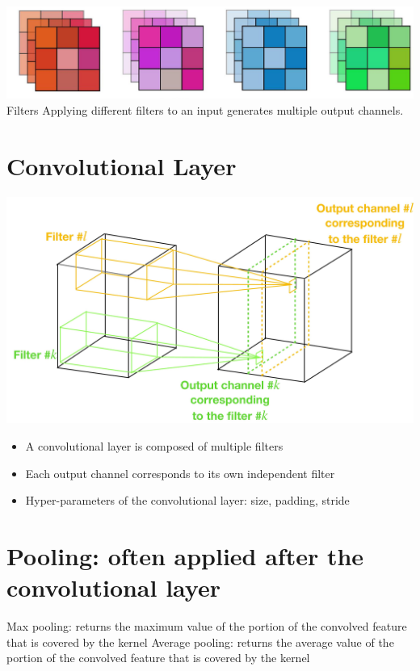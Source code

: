 \documentclass[10pt]{article}
\begin{document}
\includegraphics[max width=\textwidth, center]{2024_01_08_959e2db67a31f073f6d2g-08}
Filters
Applying different filters to an input generates multiple output channels.

\section*{Convolutional Layer}
\begin{center}
\includegraphics[max width=\textwidth]{2024_01_08_959e2db67a31f073f6d2g-09}
\end{center}

\begin{itemize}
  \item A convolutional layer is composed of multiple filters

  \item Each output channel corresponds to its own independent filter

  \item Hyper-parameters of the convolutional layer: size, padding, stride

\end{itemize}

\section*{Pooling: often applied after the convolutional layer}
Max pooling: returns the maximum value of the portion of the convolved feature that is covered by the kernel
Average pooling: returns the average value of the portion of the convolved feature that is covered by the kernel
\end{document}
